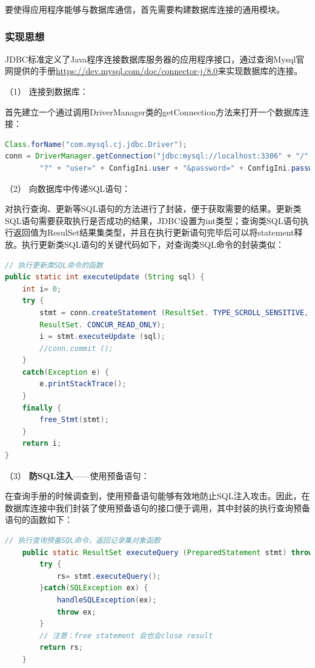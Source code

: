 \documentclass[withoutpreface,bwprint]{cumcmthesis} %
\newcommand{\kuohao}[1]{ \noindent （#1）}
\begin{document}
要使得应用程序能够与数据库通信，首先需要构建数据库连接的通用模块。

\subsubsection{实现思想}
JDBC标准定义了Java程序连接数据库服务器的应用程序接口，通过查询Mysql官网提供的手册\url{https://dev.mysql.com/doc/connector-j/8.0}来实现数据库的连接。

\vspace{1em}

\kuohao{1} 连接到数据库：

首先建立一个通过调用DriverManager类的getConnection方法来打开一个数据库连接：
\begin{lstlisting}[language=java]
Class.forName("com.mysql.cj.jdbc.Driver");
conn = DriverManager.getConnection("jdbc:mysql://localhost:3306" + "/" + ConfigIni.DBName +
        "?" + "user=" + ConfigIni.user + "&password=" + ConfigIni.passwd + "&serverTimezone=UTC");
\end{lstlisting}

\kuohao{2} 向数据库中传递SQL语句：

对执行查询、更新等SQL语句的方法进行了封装，便于获取需要的结果。更新类SQL语句需要获取执行是否成功的结果，JDBC设置为int类型；查询类SQL语句执行返回值为ResulSet结果集类型，并且在执行更新语句完毕后可以将statement释放。执行更新类SQL语句的关键代码如下，对查询类SQL命令的封装类似：
\begin{lstlisting}[language=java]
// 执行更新类SQL命令的函数
public static int executeUpdate (String sql) {
    int i= 0;
    try {
        stmt = conn.createStatement (ResultSet. TYPE_SCROLL_SENSITIVE,
        ResultSet. CONCUR_READ_ONLY);
        i = stmt.executeUpdate (sql);
        //conn.commit ();
    }
    catch(Exception e) {
        e.printStackTrace();
    }
    finally {
        free_Stmt(stmt);
    }
    return i;
}
\end{lstlisting}

\vspace{1em}
\kuohao{3} \textbf{防SQL注入}——使用预备语句：

在查询手册的时候调查到，使用预备语句能够有效地防止SQL注入攻击。因此，在数据库连接中我们封装了使用预备语句的接口便于调用，其中封装的执行查询预备语句的函数如下：
\begin{lstlisting}[language=java]
// 执行查询预备SQL命令，返回记录集对象函数
    public static ResultSet executeQuery (PreparedStatement stmt) throws SQLException{
        try {
            rs= stmt.executeQuery();
        }catch(SQLException ex) {
            handleSQLException(ex);
            throw ex;
        }
        // 注意：free statement 会也会close result
        return rs;
    }
\end{lstlisting}
\end{document}

